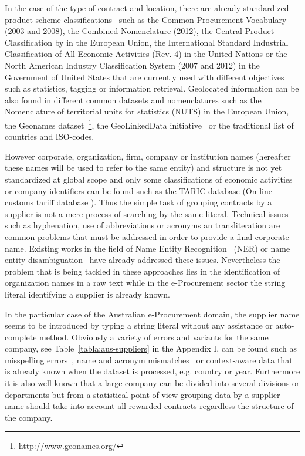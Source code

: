 \documentclass[1p,12pt]{elsarticle}
\begin{document}
In the case of the type of contract and location, there are already standardized product 
scheme classifications~\citep{DBLP:journals/ijseke/AlvarezLSASL12,DBLP:journals/chb/RodriguezGGP14} such as the Common Procurement Vocabulary (2003 and 2008), the Combined Nomenclature (2012), 
the Central Product Classification by in the European Union, the International Standard Industrial Classification of 
All Economic Activities (Rev. 4) in the United Nations or the North American Industry Classification System (2007 and 2012) 
in the Government of United States that are currently used with different objectives such as statistics, tagging or 
information retrieval. Geolocated information can be also found in different common datasets and nomenclatures such as 
the Nomenclature of territorial units for statistics (NUTS) in the European Union, the Geonames dataset~\footnote{\url{http://www.geonames.org/}}, the GeoLinkedData 
initiative~\citep{DBLP:conf/dexa/Lopez-PellicerSCZM10} or the traditional list of countries and ISO-codes.

However corporate, organization, firm, company or institution names (hereafter these names will be used to refer to 
the same entity) and structure is not yet standardized at global scope and only some classifications of economic activities or 
company identifiers can be found such as the TARIC database (On-line customs tariff database ). 
Thus the simple task of grouping contracts by a supplier is not a mere process of searching by the same literal. 
Technical issues such as hyphenation, use of abbreviations or acronyms an transliteration are common problems that must be addressed in order 
to provide a final corporate name. Existing works in the field of Name Entity Recognition~\citep{citeulike:1657521,Jung:2012:ONE:2169475.2169830} (NER) or 
name entity disambiguation~\citep{Sarmento:2009:AWN:1602022.1602085,Klein:2003:NER:1119176.1119204,DBLP:dblp_journals/eswa/GarciaASL12} have already addressed these issues. 
Nevertheless the problem that is being tackled in these approaches lies in the identification of organization names in 
a raw text while in the e-Procurement sector the string literal identifying a supplier is already known.

In the particular case of the Australian e-Procurement domain, the supplier name seems to be introduced by typing a string literal without any assistance or 
auto-complete method. Obviously a variety of errors and variants for the same company, see Table~\ref{tabla:aus-suppliers} in the Appendix I, 
can be found such as misspelling errors~\citep{NorvigSpelling,StanfordSpelling}, name and acronym mismatches~\citep{Yeates99automaticextraction,Ratinov:2004:AES:1025132.1026366} 
or context-aware data that is already known when the dataset is processed, e.g. country or year. Furthermore it is also well-known 
that a large company can be divided into several divisions or departments but from a statistical point of view grouping data by a supplier name 
should take into account all rewarded contracts regardless the structure of the company.
\end{document}
